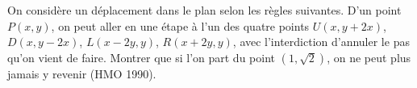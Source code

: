 On considère un déplacement dans le plan selon les règles suivantes. D'un point $P(x, y)$, on peut aller en une étape à l'un des quatre points $U(x, y + 2x)$, $D(x, y - 2x)$, $L(x - 2y, y)$, $R(x + 2y, y)$, avec l'interdiction d'annuler le pas qu'on vient de faire. Montrer que si l'on part du point $(1, \sqrt{2})$, on ne peut plus jamais y revenir (HMO 1990).
